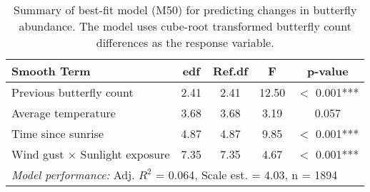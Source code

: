 \begin{table}[ht]
\centering
\caption{Summary of best-fit model (M50) for predicting changes in butterfly abundance. The model uses cube-root transformed butterfly count differences as the response variable.}
\label{tab:m50_summary}
\begin{tabular}{lcccc}
\toprule
\textbf{Smooth Term} & \textbf{edf} & \textbf{Ref.df} & \textbf{F} & \textbf{p-value} \\
\midrule
Previous butterfly count & 2.41 & 2.41 & 12.50 & $<$ 0.001*** \\
Average temperature & 3.68 & 3.68 & 3.19 & 0.057 \\
Time since sunrise & 4.87 & 4.87 & 9.85 & $<$ 0.001*** \\
Wind gust × Sunlight exposure & 7.35 & 7.35 & 4.67 & $<$ 0.001*** \\
\midrule
\multicolumn{5}{l}{\textit{Model performance:} Adj. $R^2$ = 0.064, Scale est. = 4.03, n = 1894} \\
\bottomrule
\end{tabular}
\end{table}